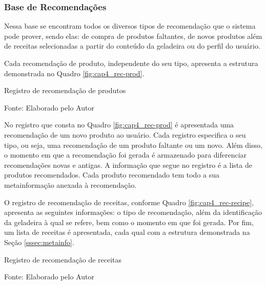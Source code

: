 \ProximoForaDoSumario 
\subsubsection{Base de Recomendações}


Nessa base se encontram todos os diversos tipos de recomendação que o sistema pode prover, sendo elas: de compra de produtos faltantes, de novos produtos além de receitas selecionadas a partir do conteúdo da geladeira ou do perfil do usuário.

Cada recomendação de produto, independente do seu tipo, apresenta a estrutura demonstrada no Quadro \ref{fig:cap4_rec-prod}.

\begin{quadro}[htb]
    \caption{Registro de recomendação de produtos}
    \label{fig:cap4_rec-prod}
    
    \footnotesize{Fonte: Elaborado pelo Autor}
\end{quadro}

No registro que consta no Quadro \ref{fig:cap4_rec-prod} é apresentada uma recomendação de um novo produto ao usuário. 
Cada registro especifica o seu tipo, ou seja, uma recomendação de um produto faltante ou um novo.
Além disso, o momento em que a recomendação foi gerada é armazenado para diferenciar recomendações novas e antigas. A informação que segue no registro é a lista de produtos recomendados. Cada produto recomendado tem todo a sua metainformação anexada à recomendação.


O registro de recomendação de receitas, conforme Quadro \ref{fig:cap4_rec-recipe}, apresenta  as seguintes informações: o tipo de recomendação, além da identificação da geladeira à qual se refere, bem como o momento em que foi gerada. Por fim, um lista de receitas é apresentada, cada qual com a estrutura demonstrada na Seção \ref{sssec:metainfo}.

\begin{quadro}[htb]
    \caption{Registro de recomendação de receitas}
    \label{fig:cap4_rec-recipe}
    
    \footnotesize{Fonte: Elaborado pelo Autor}
\end{quadro}

